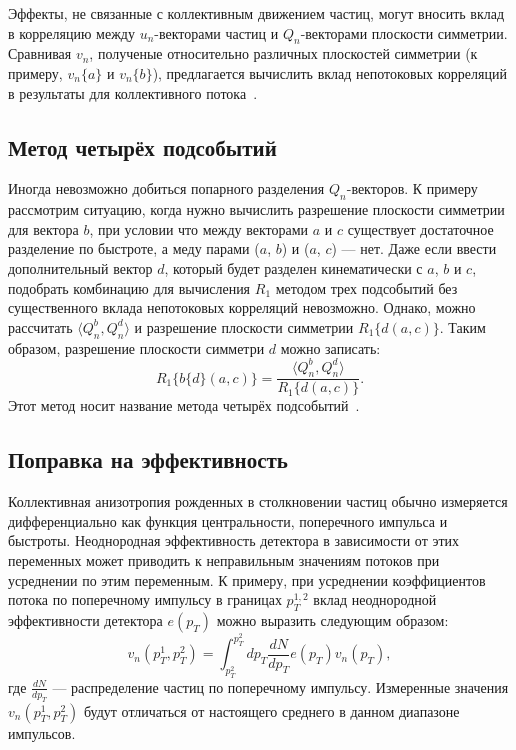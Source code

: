 Эффекты, не связанные с коллективным движением частиц, могут вносить вклад в корреляцию между $u_n$-векторами частиц и $Q_n$-векторами плоскости симметрии.
Сравнивая $v_n$, полученые относительно различных плоскостей симметрии (к примеру, $v_n\{a\}$ и $v_n\{b\}$), предлагается вычислить вклад непотоковых корреляций в результаты для коллективного потока~\cite{Mamaev:2020qom,Mamaev:2023fpr,Mamaev:2023yhz,Mamaev:2024}. 

\subsection{Метод четырёх подсобытий}

Иногда невозможно добиться попарного разделения $Q_n$-векторов. 
К примеру рассмотрим ситуацию, когда нужно вычислить разрешение плоскости симметрии для вектора $b$, при условии что между векторами $a$ и $c$ существует достаточное разделение по быстроте, а меду парами ($a$, $b$) и ($a$, $c$) --- нет.
Даже если ввести дополнительный вектор $d$, который будет разделен кинематически с $a$, $b$ и $c$, подобрать комбинацию для вычисления $R_1$ методом трех подсобытий без существенного вклада непотоковых корреляций невозможно.
Однако, можно рассчитать $\langle Q_n^b, Q_n^d \rangle$ и разрешение плоскости симметрии $R_1\{d(a,c)\}$.
Таким образом, разрешение плоскости симметри $d$ можно записать:
\begin{equation}
    R_1\{ b\{d\}(a,c) \} = \frac{ \langle Q_n^b, Q_n^d \rangle }{ R_1\{d(a,c)\} }.
    \label{eq:r1_4sub}
\end{equation}
Этот метод носит название метода четырёх подсобытий~\cite{Mamaev:2023yhz}.

\subsection{Поправка на эффективность}

Коллективная анизотропия рожденных в столкновении частиц обычно измеряется дифференциально как функция центральности, поперечного импульса и быстроты.
Неоднородная эффективность детектора в зависимости от этих переменных может приводить к неправильным значениям потоков при усреднении по этим переменным.
К примеру, при усреднении коэффициентов потока по поперечному импульсу в границах $p_T^{1,2}$ вклад неоднородной эффективности детектора $e(p_T)$ можно выразить следующим образом:
\begin{equation}
    v_n(p_T^1, p_T^2) = \int_{p_T^2}^{p_T^2} dp_T \frac{dN}{dp_T} e(p_T) v_n(p_T),
\end{equation}
где $\frac{dN}{dp_T}$ --- распределение частиц по поперечному импульсу.
Измеренные значения $v_n(p_T^1, p_T^2)$ будут отличаться от настоящего среднего в данном диапазоне импульсов.


